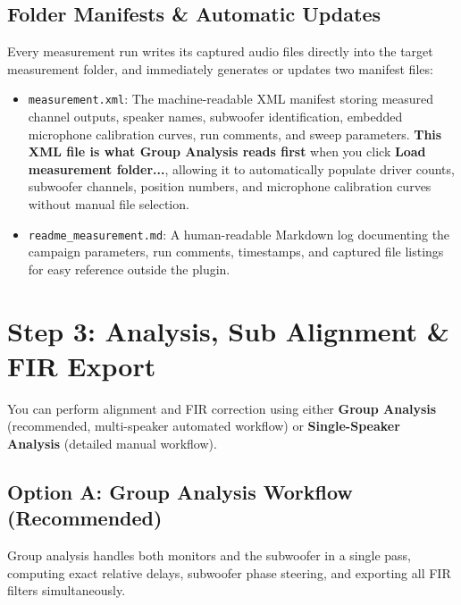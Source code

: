 \documentclass[11pt,a4paper]{article}
\begin{document}
\subsection{Folder Manifests \& Automatic Updates}
Every measurement run writes its captured audio files directly into the target measurement folder, and immediately generates or updates two manifest files:
\begin{itemize}[nosep]
  \item \texttt{measurement.xml}: The machine-readable XML manifest storing measured channel outputs, speaker names, subwoofer identification, embedded microphone calibration curves, run comments, and sweep parameters. \textbf{This XML file is what Group Analysis reads first} when you click \textbf{Load measurement folder...}, allowing it to automatically populate driver counts, subwoofer channels, position numbers, and microphone calibration curves without manual file selection.
  \item \texttt{readme\_measurement.md}: A human-readable Markdown log documenting the campaign parameters, run comments, timestamps, and captured file listings for easy reference outside the plugin.
\end{itemize}

\clearpage

\section{Step 3: Analysis, Sub Alignment \& FIR Export}\label{sec:step3}

You can perform alignment and FIR correction using either \textbf{Group Analysis} (recommended, multi-speaker automated workflow) or \textbf{Single-Speaker Analysis} (detailed manual workflow).

\subsection{Option A: Group Analysis Workflow (Recommended)}\label{sec:group-wf}

Group analysis handles both monitors and the subwoofer in a single pass, computing exact relative delays, subwoofer phase steering, and exporting all FIR filters simultaneously.
\end{document}
